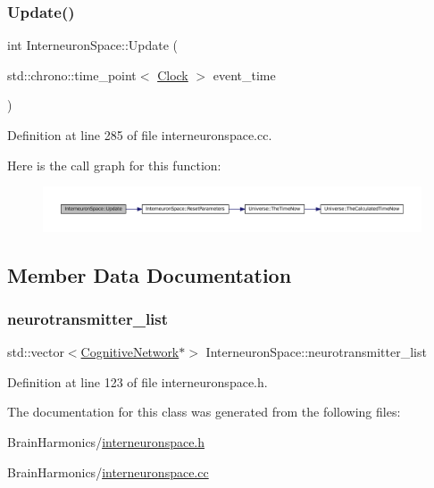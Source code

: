 \subsubsection{\texorpdfstring{Update()}{Update()}}
{\footnotesize\ttfamily int Interneuron\+Space\+::\+Update (\begin{DoxyParamCaption}\item[{std\+::chrono\+::time\+\_\+point$<$ \mbox{\hyperlink{universe_8h_a0ef8d951d1ca5ab3cfaf7ab4c7a6fd80}{Clock}} $>$}]{event\+\_\+time }\end{DoxyParamCaption})}



Definition at line 285 of file interneuronspace.\+cc.

Here is the call graph for this function\+:\nopagebreak
\begin{figure}[H]
\begin{center}
\leavevmode
\includegraphics[width=350pt]{class_interneuron_space_a72ce2431e1348dd2558fa9b8f864d306_cgraph}
\end{center}
\end{figure}


\subsection{Member Data Documentation}
\mbox{\label{class_interneuron_space_a51d51c2f71f6fcf65c478aa27457c4a3}} 
\subsubsection{\texorpdfstring{neurotransmitter\+\_\+list}{neurotransmitter\_list}}
{\footnotesize\ttfamily std\+::vector$<$\mbox{\hyperlink{class_cognitive_network}{Cognitive\+Network}}$\ast$$>$ Interneuron\+Space\+::neurotransmitter\+\_\+list\hspace{0.3cm}{\ttfamily [protected]}}



Definition at line 123 of file interneuronspace.\+h.



The documentation for this class was generated from the following files\+:\begin{DoxyCompactItemize}
\item 
Brain\+Harmonics/\mbox{\hyperlink{interneuronspace_8h}{interneuronspace.\+h}}\item 
Brain\+Harmonics/\mbox{\hyperlink{interneuronspace_8cc}{interneuronspace.\+cc}}\end{DoxyCompactItemize}

